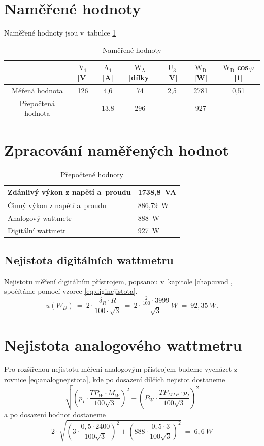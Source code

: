 \documentclass[a4paper,12pt]{article}   %
\begin{document}
\section{Naměřené hodnoty}
Naměřené hodnoty jsou v~tabulce \ref{tab:nam}
\begin{table}
  \centering
  \begin{tabular}{|c|c|c|c|c|c|c|}
    \hline
    &$\textrm{V}_\textrm{1}$[V]&$\textrm{A}_\textrm{1} $[A]&$\textrm{W}_\textrm{A} $[dílky]&$\textrm{U}_\textrm{3}$[V]&$\textrm{W}_\textrm{D}$ [W]&$\textrm{W}_\textrm{D}$ cos\,$\varphi$[1]\\\hline\hline
    Měřená hodnota&126&4,6&74&2,5&2781&0,51\\\hline
    Přepočtená hodnota&&13,8&296&&927&\\\hline
  \end{tabular}
  \caption{Naměřené hodnoty}
  \label{tab:nam}
\end{table}




\section{Zpracování naměřených hodnot}

\begin{table}[h!]
  \centering
  \begin{tabular}{|l|l|}
    \hline
    Zdánlivý výkon z napětí a~proudu &1738,8~VA\\\hline
    Činný výkon z napětí a~proudu &886,79~W\\\hline
    Analogový wattmetr &888~W\\\hline
    Digitální wattmetr &927~W\\\hline
  \end{tabular}
  \caption{Přepočtené hodnoty}
  \label{tab:spocteno}
\end{table}
\subsection{Nejistota digitálních wattmetru}
Nejistotu měření digitálním přístrojem, popsanou v~kapitole \ref{chap:uvod}, spočítáme pomocí vzorce \ref{eq:diginejistota}.
\begin{equation*}
  u(W_D)~=~2\cdot\frac{\delta_R\cdot R}{100\cdot\sqrt{3}}~=~2\cdot \frac{\frac{2}{100}\cdot 3999}{\sqrt{3}}~W~=~92,35~W.
\end{equation*}
\section{Nejistota analogového wattmetru}
Pro rozšířenou nejistotu měření analogovým přístrojem budeme vycházet z rovnice \ref{eq:analognejistota}, kde po dosazení dílčích nejistot dostaneme
\begin{equation*}
  \sqrt{\left(p_I \cdot \frac{TP_W\cdot M_W}{100\sqrt{3}}\right)^2 + \left(P_W \cdot \frac{TP_{MTP} \cdot p_I}{100\sqrt{3}}\right)^2}
\end{equation*}
a po dosazení hodnot dostaneme
\begin{equation*}
  2\cdot\sqrt{\left(3 \cdot \frac{0,5\cdot 2400}{100\sqrt{3}}\right)^2 + \left(888 \cdot \frac{0,5 \cdot 3}{100\sqrt{3}}\right)^2}~=~6,6~W
\end{equation*}
\end{document}

